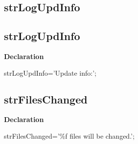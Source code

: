 \documentclass{report}
\newif\ifpdf
\begin{document}
\subsection*{\large{\textbf{strLogUpdInfo}}\normalsize\hspace{1ex}\hrulefill}
\else
\subsection*{strLogUpdInfo}
\fi
\label{trstrings-strLogUpdInfo}
\begin{list}{}{
\setlength{\itemindent}{0cm}
\setlength{\listparindent}{0cm}
\setlength{\leftmargin}{\evensidemargin}
\addtolength{\leftmargin}{\tmplength}
\settowidth{\labelsep}{X}
\addtolength{\leftmargin}{\labelsep}
\setlength{\labelwidth}{\tmplength}
}
\item[\textbf{Declaration}\hfill]
\ifpdf
\begin{flushleft}
\fi
\begin{ttfamily}
strLogUpdInfo='Update info:';\end{ttfamily}

\ifpdf
\end{flushleft}
\fi

\end{list}
\ifpdf
\subsection*{\large{\textbf{strFilesChanged}}\normalsize\hspace{1ex}\hrulefill}
\else
\subsection*{strFilesChanged}
\fi
\label{trstrings-strFilesChanged}
\begin{list}{}{
\setlength{\itemindent}{0cm}
\setlength{\listparindent}{0cm}
\setlength{\leftmargin}{\evensidemargin}
\addtolength{\leftmargin}{\tmplength}
\settowidth{\labelsep}{X}
\addtolength{\leftmargin}{\labelsep}
\setlength{\labelwidth}{\tmplength}
}
\item[\textbf{Declaration}\hfill]
\ifpdf
\begin{flushleft}
\fi
\begin{ttfamily}
strFilesChanged='{\%}f files will be changed.';\end{ttfamily}

\ifpdf
\end{flushleft}
\fi

\end{list}
\ifpdf
\end{document}
